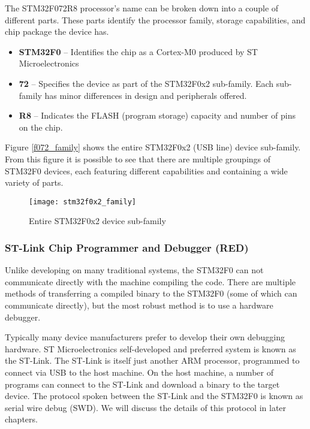 \documentclass[11pt,fleqn]{book} %
\begin{document}
The STM32F072R8 processor's name can be broken down into a couple of different parts. These parts identify the processor family, storage capabilities, and chip package the device has.

\begin{itemize}
    \item \textbf{STM32F0} -- Identifies the chip as a Cortex-M0 produced by ST Microelectronics
    \item \textbf{72} -- Specifies the device as part of the STM32F0x2 sub-family. Each sub-family has minor differences in design and peripherals offered.
    \item \textbf{R8} -- Indicates the FLASH (program storage) capacity and number of pins on the chip.  
\end{itemize} 
Figure \vref{f072_family} shows the entire STM32F0x2 (USB line) device sub-family. From this figure it is possible to see that there are multiple groupings of STM32F0 devices, each featuring different capabilities and containing a wide variety of parts.

\begin{figure}[]
	\centering\texttt{[image: stm32f0x2\_family]}
	\caption{Entire STM32F0x2 device sub-family}
	\label{f072_family}
\end{figure}

\subsubsection*{ST-Link Chip Programmer and Debugger ({\color{red!90!black}RED})}
Unlike developing on many traditional systems, the STM32F0 can not communicate directly with the machine compiling the code. There are multiple methods of transferring a compiled binary to the STM32F0 (some of which can communicate directly), but the most robust method is to use a hardware debugger.

Typically many device manufacturers prefer to develop their own debugging hardware. ST Microelectronics self-developed and preferred system is known as the ST-Link. The ST-Link is itself just another ARM processor, programmed to connect via USB to the host machine. On the host machine, a number of programs can connect to the ST-Link and download a binary to the target device. The protocol spoken between the ST-Link and the STM32F0 is known as serial wire debug (SWD).  We will discuss the details of this protocol in later chapters.
\end{document}

